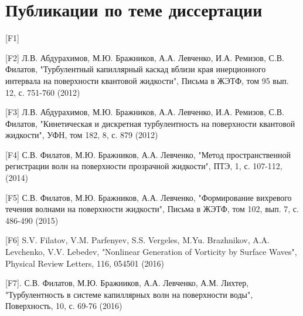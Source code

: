 \clearpage                                  %
\insertbibliofull                           %

\chapter*{Публикации по теме диссертации}						%


[F1]

[F2] Л.В. Абдурахимов, М.Ю. Бражников, А.А. Левченко, И.А. Ремизов, С.В. Филатов, "Турбулентный капиллярный каскад вблизи края инерционного интервала на поверхности квантовой жидкости", Письма в ЖЭТФ, том 95 вып. 12, с. 751-760 (2012)

[F3] Л.В. Абдурахимов, М.Ю. Бражников, А.А. Левченко, И.А. Ремизов, С.В. Филатов, "Кинетическая и дискретная турбулентность на поверхности квантовой жидкости", УФН, том 182, 8, с. 879 (2012)

[F4] С.В. Филатов, М.Ю. Бражников, А.А. Левченко, "Метод пространственной регистрации волн на поверхности прозрачной жидкости", ПТЭ, 1, с. 107-112, (2014)

[F5] С.В. Филатов, М.Ю. Бражников, А.А. Левченко, "Формирование вихревого течения волнами на поверхности жидкости", Письма в ЖЭТФ, том 102, вып. 7, с. 486-490 (2015)

[F6] S.V. Filatov, V.M. Parfenyev, S.S. Vergeles, M.Yu. Brazhnikov, A.A. Levchenko, V.V. Lebedev, "Nonlinear Generation of Vorticity by Surface Waves", Physical Review Letters, 116, 054501 (2016)

[F7]. С.В. Филатов, М.Ю. Бражников, А.А. Левченко,  А.М. Лихтер, "Турбулентность в системе капиллярных волн на поверхности воды", Поверхность, 10, с. 69-76 (2016)

